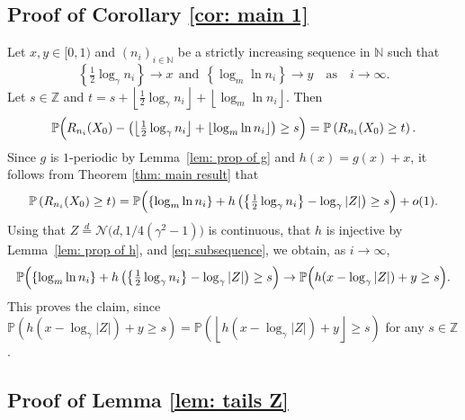 \documentclass[11pt]{article}
\newcommand{\Prob}{\mathbb{P}}
\numberwithin{theorem}{section}
\begin{document}
\subsection{Proof of Corollary \ref{cor: main 1}}
Let $x,y\in[0,1)$ and $(n_i)_{i\in\mathbb{N}}$ be a strictly increasing sequence in $\mathbb{N}$ such that
\begin{equation}\label{eq: subsequence}
\left\{\tfrac{1}{2}\log_\gamma n_i\right\}\to x
~~
\text{and}
~~
\left\{\log_m\ln n_i\right\} \to y
\quad
\text{as}
\quad
i \to\infty.
\end{equation}
Let $s\in \mathbb{Z}$ and $t=s+\left\lfloor\frac{1}{2}\log_\gamma n_i\right\rfloor+\left\lfloor\log_m\ln n_i\right\rfloor$. Then
\[
\Prob\Bigl(R_{n_i}(X_0) - \left(\left\lfloor\tfrac{1}{2} \log_\gamma n_i\right\rfloor + \lfloor \log_m\ln n_i\rfloor\right)\geq s\Bigr) = \Prob\left(R_{n_i}(X_0)\geq t\right).
\]
Since $g$ is $1$-periodic by Lemma~\ref{lem: prop of g} and $h(x)=g(x)+x$, it follows from Theorem \ref{thm: main result} that 
\[
    \Prob\left(R_{n_i}(X_0)\geq t\right)
    = \Prob
        \Bigl(\left\{\log_m\ln n_i\right\}
            +h\left(\left\{\tfrac{1}{2}\log_\gamma n_i\right\}-\log_\gamma|Z|\right)\geq s
        \Bigr)+o(1).
\]
Using that $Z \stackrel{d}{=} \mathcal{N}\big(d, 1/4(\gamma^2 - 1)\big)$ is continuous, that $h$ is injective by Lemma~\ref{lem: prop of h}, and \eqref{eq: subsequence}, we obtain, as $i \to \infty$,
\[
\Prob\Bigl(\left\{\log_m\ln n_i\right\}+h\left(\left\{\tfrac{1}{2}\log_\gamma n_i\right\}-\log_\gamma|Z|\right)\geq s\Bigr) \to \Prob\Bigl( h(x-\log_\gamma|Z|)+y\geq s\Bigr).
\]
This proves the claim, since $\Prob( h(x-\log_\gamma|Z|)+y\geq s) = \Prob( \left\lfloor h(x-\log_\gamma|Z|)+y\right \rfloor\geq s)$ for any $s\in\mathbb{Z}$.


\subsection{Proof of Lemma \ref{lem: tails Z}}
\end{document}
